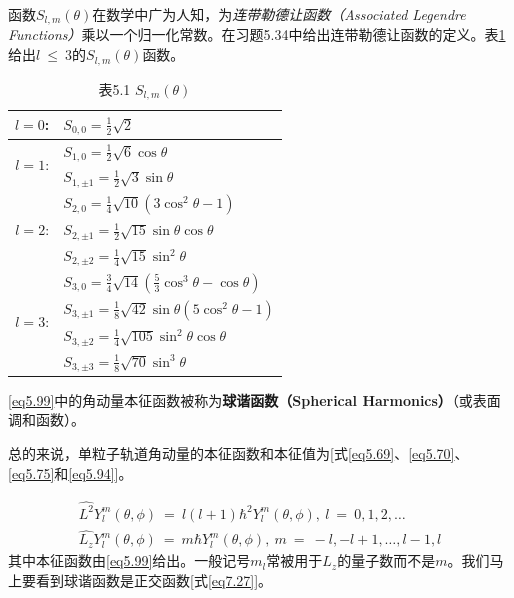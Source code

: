\documentclass[12pt,a4paper,openany]{ctexbook}
\begin{document}
\begin{flushleft}
函数$S_{l,m}(\theta)$在数学中广为人知，为\textit{连带勒德让函数（Associated Legendre Functions）}乘以一个归一化常数。在习题5.34中给出连带勒德让函数的定义。表\ref{tab5.1}给出$l\ \leq\ 3$的$S_{l,m}(\theta)$函数。
\begin{table}[htbp]
    \centering
    \caption{表5.1 $S_{l,m}(\theta)$}
    \label{tab5.1}
        \begin{tabular}{cl}
            \hline
            $l=0$: & $S_{0,0} = \frac{1}{2}\sqrt{2}$ \\
            \hline
            \multirow{2}{*}{$l=1$:} 
            & $S_{1,0} = \frac{1}{2}\sqrt{6}\cos\theta$ \\
            & $S_{1,\pm 1} = \frac{1}{2}\sqrt{3}\sin\theta$ \\
            \hline
            \multirow{3}{*}{$l=2$:} 
            & $S_{2,0} = \frac{1}{4}\sqrt{10}\left(3\cos^2\theta - 1\right)$ \\
            & $S_{2,\pm 1} = \frac{1}{2}\sqrt{15}\sin\theta\cos\theta$ \\
            & $S_{2,\pm 2} = \frac{1}{4}\sqrt{15}\sin^2\theta$ \\
            \hline
            \multirow{4}{*}{$l=3$:} 
            & $S_{3,0} = \frac{3}{4}\sqrt{14}\left(\frac{5}{3}\cos^3\theta - \cos\theta\right)$ \\
            & $S_{3,\pm 1} = \frac{1}{8}\sqrt{42}\sin\theta\left(5\cos^2\theta - 1\right)$ \\
            & $S_{3,\pm 2} = \frac{1}{4}\sqrt{105}\sin^2\theta\cos\theta$ \\
            & $S_{3,\pm 3} = \frac{1}{8}\sqrt{70}\sin^3\theta$ \\
            \hline
        \end{tabular}
\end{table}

\eqref{eq5.99}中的角动量本征函数被称为\textbf{球谐函数（Spherical Harmonics）}（或表面调和函数）。

总的来说，单粒子轨道角动量的本征函数和本征值为[式\eqref{eq5.69}、\eqref{eq5.70}、\eqref{eq5.75}和\eqref{eq5.94}]。

\begin{gather}
    \boxed{\hat{L^2}Y_l^m(\theta,\phi)\ =\ l(l+1)\hbar^2Y_l^m(\theta,\phi),\ l\ =\ 0,1,2,\dots} \label{eq5.104} \\
    \boxed{\hat{L_z}Y_l^m(\theta,\phi)\ =\ m\hbar Y_l^m(\theta,\phi),\ m\ =\ -l,-l+1,\dots,l-1,l} \label{eq5.105}
\end{gather}
其中本征函数由\eqref{eq5.99}给出。一般记号$m_l$常被用于$L_z$的量子数而不是$m$。我们马上要看到球谐函数是正交函数[式\eqref{eq7.27}]。


\end{flushleft}
\end{document}
